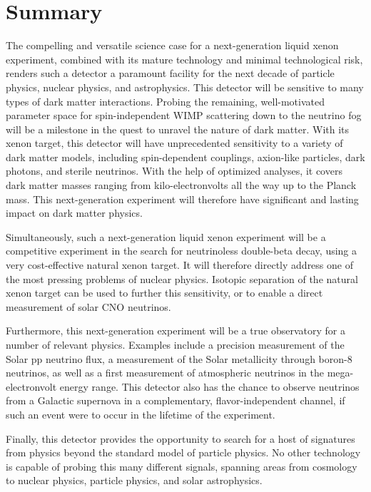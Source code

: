 \section{Summary}\label{sec:summary}

The compelling and versatile science case for a next-generation liquid xenon experiment, combined with its mature technology and minimal technological risk, renders such a detector a paramount facility for the next decade of particle physics, nuclear physics, and astrophysics. This detector will be sensitive to many types of dark matter interactions. Probing the remaining, well-motivated parameter space for spin-independent WIMP scattering down to the neutrino fog will be a milestone in the quest to unravel the nature of dark matter. With its xenon target, this detector will have unprecedented sensitivity to a variety of dark matter models, including spin-dependent couplings, axion-like particles, dark photons, and sterile neutrinos. With the help of optimized analyses, it covers dark matter masses ranging from kilo-electronvolts all the way up to the Planck mass. This next-generation experiment will therefore have significant and lasting impact on dark matter physics.

Simultaneously, such a next-generation liquid xenon experiment will be a competitive experiment in the search for neutrinoless double-beta decay, using a very cost-effective natural xenon target. It will therefore directly address one of the most pressing problems of nuclear physics. Isotopic separation of the natural xenon target can be used to further this sensitivity, or to enable a direct measurement of solar CNO neutrinos. 

Furthermore, this next-generation experiment will be a true observatory for a number of relevant physics. Examples include a precision measurement of the Solar pp neutrino flux, a measurement of the Solar metallicity through boron-8 neutrinos, as well as a first measurement of atmospheric neutrinos in the mega-electronvolt energy range. This detector also has the chance to observe neutrinos from a Galactic supernova in a complementary, flavor-independent channel, if such an event were to occur in the lifetime of the experiment. 

Finally, this detector provides the opportunity to search for a host of signatures from physics beyond the standard model of particle physics. No other technology is capable of probing this many different signals, spanning areas from cosmology to nuclear physics, particle physics, and solar astrophysics.

